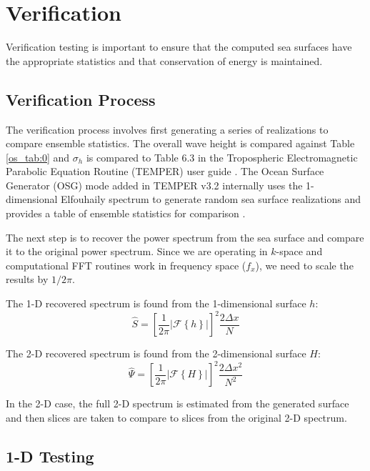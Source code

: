 \section{Verification}
Verification testing is important to ensure that the computed sea surfaces have the appropriate statistics and that conservation of energy is maintained.

\subsection{Verification Process}
The verification process involves first generating a series of realizations to compare ensemble statistics. The overall wave height is compared against Table \ref{os_tab:0} and $\sigma_h$ is compared to Table 6.3 in the Tropospheric Electromagnetic Parabolic Equation Routine (TEMPER) user guide \cite{temper_guide}. The Ocean Surface Generator (OSG) mode added in TEMPER v3.2 internally uses the 1-dimensional Elfouhaily spectrum to generate random sea surface realizations and provides a table of ensemble statistics for comparison \cite{temper_guide}. 

The next step is to recover the power spectrum from the sea surface and compare it to the original power spectrum. Since we are operating in $k$-space and computational FFT routines work in frequency space ($f_x$), we need to scale the results by $1/2\pi$. 

The 1-D recovered spectrum is found from the 1-dimensional surface $h$:
\begin{equation}
\label{os_eq:ab}
\hat{S} = \left[\frac{1}{2\pi}\left|\mathcal{F}\left\{ h\right\} \right| \right]^2\frac{2 \Delta x}{N}
\end{equation}

The 2-D recovered spectrum is found from the 2-dimensional surface $H$:
\begin{equation}
\label{os_eq:ba}
\hat{\Psi} = \left[\frac{1}{2\pi}\left|\mathcal{F}\left\{ H\right\} \right| \right]^2\frac{2 \Delta x^2}{N^2}
\end{equation}

In the 2-D case, the full 2-D spectrum is estimated from the generated surface and then slices are taken to compare to slices from the original 2-D spectrum. 

\subsection{1-D Testing}
